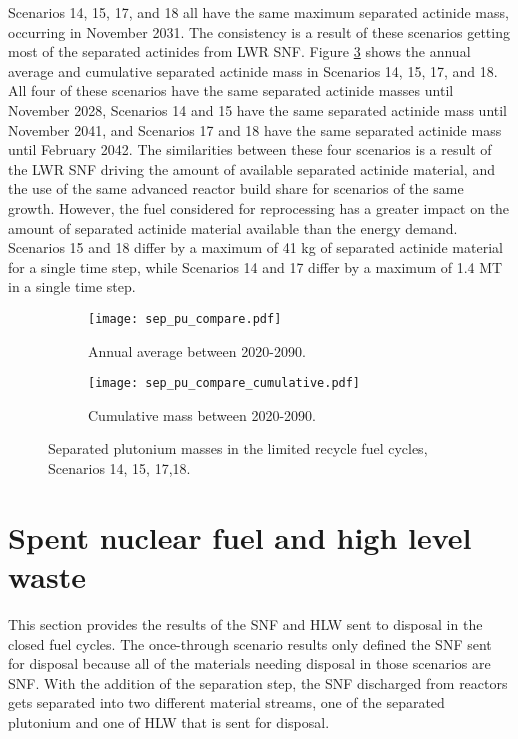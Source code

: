 Scenarios 14, 15, 17, 
and 18 all have the same maximum separated actinide mass, occurring in 
November 2031. The consistency is a result of these scenarios getting 
most of the separated actinides from \gls{LWR} \gls{SNF}. Figure 
\ref{fig:recycle_sep_pu} shows the annual average and cumulative 
separated actinide mass in Scenarios 14, 15, 17, and 18. All four of 
these scenarios have the same separated actinide masses until 
November 2028, Scenarios 14 and 15 have the same separated actinide 
mass until November 2041, and Scenarios 17 and 18 have the same separated 
actinide mass until February 2042. The similarities between these four 
scenarios is a result of the \gls{LWR} \gls{SNF} driving the amount 
of available separated actinide material, and the use of the 
same advanced reactor build share for scenarios of the same growth. 
However, the fuel considered for reprocessing has a greater impact 
on the amount of separated actinide material available than the 
energy demand. Scenarios 15 and 18 differ by a maximum of 41 kg of 
separated actinide material for a single time step, while Scenarios 
14 and 17 differ by a maximum of 1.4 MT in a single time step. 

\begin{figure}[h!]
    \centering
    \begin{subfigure}[b]{0.49\textwidth}
        \centering
        \texttt{[image: sep\_pu\_compare.pdf]}
        \caption{Annual average between 2020-2090.}
        \label{fig:_recycle_sep_pu_all}
    \end{subfigure}
    \hfill
    \begin{subfigure}[b]{0.49\textwidth}
        \centering
        \texttt{[image: sep\_pu\_compare\_cumulative.pdf]}
        \caption{Cumulative mass between 2020-2090.}
        \label{fig:recycle_sep_pu_cumulative}
    \end{subfigure}
       \caption{Separated plutonium masses in the limited 
       recycle fuel cycles, Scenarios 14, 15, 17,18.}
       \label{fig:recycle_sep_pu}
\end{figure}

\section{Spent nuclear fuel and high level waste}
This section provides the results of the \gls{SNF} and \gls{HLW} sent 
to disposal in the closed fuel cycles. The once-through scenario 
results only defined the \gls{SNF} sent for disposal because all 
of the materials needing disposal in those scenarios are \gls{SNF}. 
With the addition of the separation step, the \gls{SNF} discharged 
from reactors gets separated into two different material streams, 
one of the separated plutonium and one of \gls{HLW} that is sent 
for disposal.

